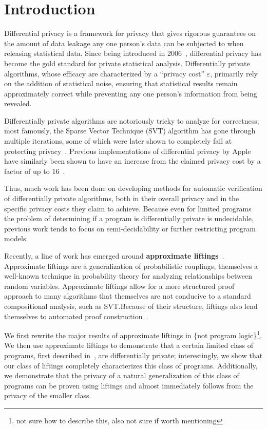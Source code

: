 \documentclass[12pt]{article}
\theoremstyle{definition}
\begin{document}
\section{Introduction}

Differential privacy is a framework for privacy that gives rigorous guarantees on the amount of data leakage any one person's data can be subjected to when releasing statistical data. Since being introduced in 2006~\cite{DP2006}, differential privacy has become the gold standard for private statistical analysis. 
Differentially private algorithms, whose efficacy are characterized by a ``privacy cost'' $\varepsilon$, primarily rely on the addition of statistical noise, ensuring that statistical results remain approximately correct while preventing any one person's information from being revealed. 

Differentially private algorithms are notoriously tricky to analyze for correctness; most famously, the Sparse Vector Technique (SVT) algorithm has gone through multiple iterations, some of which were later shown to completely fail at protecting privacy~\cite{10.14778/3055330.3055331}. Previous implementations of differential privacy by Apple have similarly been shown to have an increase from the claimed privacy cost by a factor of up to 16~\cite{appleleakprivacy}. 

Thus, much work has been done on developing methods for automatic verification of differentially private algorithms, both in their overall privacy and in the specific privacy costs they claim to achieve. 
Because even for limited programs the problem of determining if a program is differentially private is undecidable\cite{barthe.etal2020decidingdp}, previous work tends to focus on semi-decidability or further restricting program models. 

Recently, a line of work has emerged around \textbf{approximate liftings}~\cite{BartheEtAl2016,bartheKopfOlmedo2012ProbabilisticRelationalReasoningforDifferentialPriv,BartheOlmedo2013,HsuThesis2017}. Approximate liftings are a generalization of probabilistic couplings, themselves a well-known technique in probability theory for analyzing relationships between random variables. 
Approximate liftings allow for a more structured proof approach to many algorithms that themselves are not conducive to a standard compositional analysis, such as SVT.\@ Because of their structure, liftings also lend themselves to automated proof construction~\cite{AlbarghouthiHsu2018}. 

We first rewrite the major results of approximate liftings in \{not program logic\}\footnote{not sure how to describe this, also not sure if worth mentioning}. 
We then use approximate liftings to demonstrate that a certain limited class of programs, first described in~\cite{chadhaLinearTimeDecidability2021}, are differentially private; interestingly, we show that our class of liftings completely characterizes this class of programs. Additionally, we demonstrate that the privacy of a natural generalization of this class of programs can be proven using liftings and almost immediately follows from the privacy of the smaller class. 
\end{document}
